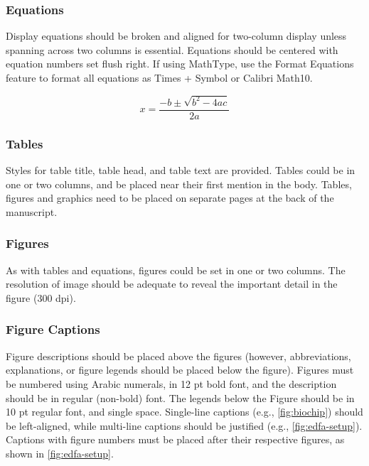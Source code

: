 \documentclass[12pt, twocolumn, a4paper]{article}
\begin{document}
\subsubsection{Equations}

Display equations should be broken and aligned for two-column display unless spanning across two columns is essential. Equations should be centered with equation numbers set flush right. If using MathType, use the Format Equations feature to format all equations as Times + Symbol  or Calibri Math10.

\begin{equation}
x = \frac{-b \pm \sqrt{b^2 - 4ac}}{2a}
\end{equation}


\subsubsection{Tables}

Styles for table title, table head, and table text are provided. Tables could be in one or two columns, and be placed near their first mention in the body. Tables, figures and graphics need to be placed on separate pages at the back of the manuscript.

\subsubsection{Figures}
As with tables and equations, figures could be set in one or two columns. The resolution of image should be adequate to reveal the important detail in the figure (300 dpi).



\subsubsection{Figure Captions}

Figure descriptions should be placed above the figures (however, abbreviations, explanations, or figure legends should be placed below the figure). Figures must be numbered using Arabic numerals, in 12 pt bold font, and the description should be in regular (non-bold) font. The legends below the Figure should be in 10 pt regular font, and single space. Single-line captions (e.g., \autoref{fig:biochip}) should be left-aligned, while multi-line captions should be justified (e.g., \autoref{fig:edfa-setup}). Captions with figure numbers must be placed after their respective figures, as shown in \autoref{fig:edfa-setup}.
\end{document}
